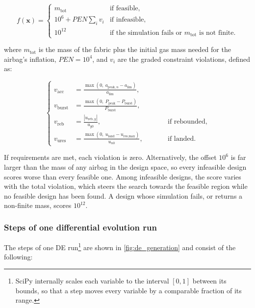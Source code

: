 \begin{equation}\label{eq:objective}
  f(\mathbf{x}) =
  \begin{cases}
    m_\text{tot} & \text{if feasible,}\\[2ex]
    10^6 + \mathit{PEN}\sum_i v_i & \text{if infeasible,}\\[2ex]
    10^{12} & \text{if the simulation fails or } m_\text{tot} \text{ is not finite.}
  \end{cases}
\end{equation}

where $m_\text{tot}$ is the mass of the fabric plus the initial gas mass needed for the airbag's inflation, $\mathit{PEN} = 10^4$, and $v_i$ are the graded constraint violations, defined as:

\begin{equation}\label{eq:violations}
  \left\{
  \begin{aligned}
    v_\text{acc}   &= \frac{\max(0,\ a_{\text{peak},n} - a_\text{lim})}{a_\text{lim}}, \\[1ex]
    v_\text{burst} &= \frac{\max(0,\ P_\text{peak} - P_\text{burst})}{P_\text{burst}}, \\[1ex]
    v_\text{reb}   &= \frac{|u_{\text{reb},y}|}{u_{y0}}, &&\qquad \text{if rebounded,} \\[1ex]
    v_\text{ures}  &= \frac{\max(0,\ u_\text{land} - u_\text{res,max})}{u_{n0}}, &&\qquad \text{if landed.}
  \end{aligned}
  \right.
\end{equation}

If requirements are met, each violation is zero. Alternatively, the offset $10^6$ is far larger than the mass of any airbag in the design space, so every infeasible design scores worse than every feasible one. Among infeasible designs, the score varies with the total violation, which steers the search towards the feasible region while no feasible design has been found. A design whose simulation fails, or returns a non-finite mass, scores $10^{12}$.


\subsubsection{Steps of one differential evolution run}
The steps of one DE run\footnote{ SciPy internally scales each variable to the interval $[0, 1]$ between its bounds, so that a step moves every variable by a comparable fraction of its range.} are shown in \cref{fig:de_generation} and consist of the following:

